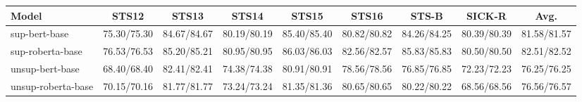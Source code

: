 \begin{tabular}{lcccccccc}
\toprule
Model & STS12 & STS13 & STS14 & STS15 & STS16 & STS-B & SICK-R & Avg. \\
\midrule
sup-bert-base & 75.30/75.30 & 84.67/84.67 & 80.19/80.19 & 85.40/85.40 & 80.82/80.82 & 84.26/84.25 & 80.39/80.39 & 81.58/81.57 \\
sup-roberta-base & 76.53/76.53 & 85.20/85.21 & 80.95/80.95 & 86.03/86.03 & 82.56/82.57 & 85.83/85.83 & 80.50/80.50 & 82.51/82.52 \\
unsup-bert-base & 68.40/68.40 & 82.41/82.41 & 74.38/74.38 & 80.91/80.91 & 78.56/78.56 & 76.85/76.85 & 72.23/72.23 & 76.25/76.25 \\
unsup-roberta-base & 70.15/70.16 & 81.77/81.77 & 73.24/73.24 & 81.35/81.36 & 80.65/80.65 & 80.22/80.22 & 68.56/68.56 & 76.56/76.57 \\
\bottomrule
\end{tabular}